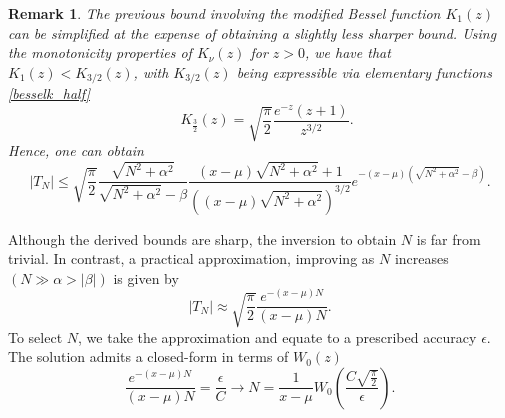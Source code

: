 \documentclass[10pt,a4paper,oneside]{article}
\newtheorem{remark}[theorem]{Remark}
\numberwithin{equation}{section}
\begin{document}
\begin{remark}The previous bound involving the modified Bessel function $K_1(z)$ can be simplified at the expense of obtaining a slightly less sharper bound. Using the monotonicity properties of $K_{\nu}(z)$ for $z > 0$, we have that $K_1(z) < K_{3/2}(z)$, with $K_{3/2}(z)$ being expressible via elementary functions \eqref{besselk_half}
\begin{equation*}
\quad K_{\frac{3}{2}}(z) = \sqrt{\frac{\pi}{2}}\frac{e^{-z} (z+1)}{z^{3/2}}.
\end{equation*}
Hence, one can obtain
\begin{equation}
|T_N| \le  \sqrt{\frac{\pi}{2}}\frac{\sqrt{N^2 + \alpha^2}}{\sqrt{N^2 + \alpha^2} - \beta} \frac{(x-\mu)\sqrt{N^2 + \alpha^2} + 1}{\left((x-\mu) \sqrt{N^2 + \alpha^2}\right)^{3/2}} e^{-(x-\mu)\left(\sqrt{N^2 + \alpha^2} - \beta\right)}.
\end{equation}
\end{remark}
Although the derived bounds are sharp, the inversion to obtain $N$ is far from trivial. In contrast, a practical approximation, improving as $N$ increases $(N \gg \alpha > |\beta|)$ is given by
\begin{equation}
|T_N| \approx \sqrt{\frac{\pi}{2}} \frac{e^{-(x-\mu)N}}{(x-\mu) N}.
\end{equation}
To select $N$, we take the approximation and equate to a prescribed accuracy $\epsilon$. The solution admits a closed-form in terms of $W_0(z)$
\begin{equation}
\frac{e^{-(x-\mu)N}}{(x-\mu)N} = \frac{\epsilon}{C} \longrightarrow N = \frac{1}{x-\mu}W_0\left(\frac{C \sqrt{\frac{\pi}{2}}}{\epsilon}\right).
\end{equation}
\end{document}
